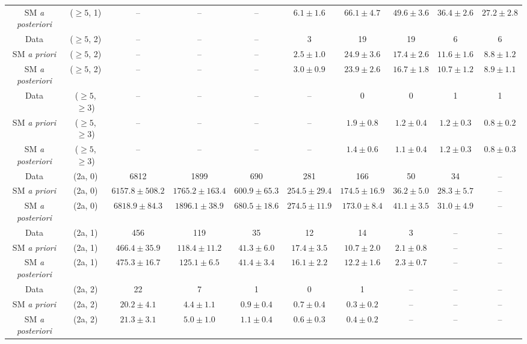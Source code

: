 \begin{table}[h!]
{\begin{tabular}{cccccccccc}
	SM \textit{a posteriori} & ($\ge5$, 1) & -- & -- & -- & $6.1\pm 1.6$ & $66.1\pm 4.7$ & $49.6\pm 3.6$ & $36.4\pm 2.6$ & $27.2\pm 2.8$ \\[0.5ex] 
	Data & ($\ge5$, 2) & -- & -- & -- & 3 & 19 & 19 & 6 & 6 \\[0.5ex] 
	SM \textit{a priori} & ($\ge5$, 2) & -- & -- & -- & $2.5\pm 1.0$ & $24.9\pm 3.6$ & $17.4\pm 2.6$ & $11.6\pm 1.6$ & $8.8\pm 1.2$ \\[0.5ex] 
	SM \textit{a posteriori} & ($\ge5$, 2) & -- & -- & -- & $3.0\pm 0.9$ & $23.9\pm 2.6$ & $16.7\pm 1.8$ & $10.7\pm 1.2$ & $8.9\pm 1.1$ \\[0.5ex] 
	Data & ($\ge5$, $\ge3$) & -- & -- & -- & -- & 0 & 0 & 1 & 1 \\[0.5ex] 
	SM \textit{a priori} & ($\ge5$, $\ge3$) & -- & -- & -- & -- & $1.9\pm 0.8$ & $1.2\pm 0.4$ & $1.2\pm 0.3$ & $0.8\pm 0.2$ \\[0.5ex] 
	SM \textit{a posteriori} & ($\ge5$, $\ge3$) & -- & -- & -- & -- & $1.4\pm 0.6$ & $1.1\pm 0.4$ & $1.2\pm 0.3$ & $0.8\pm 0.3$ \\[0.5ex] 
	Data & (2a, 0) & 6812 & 1899 & 690 & 281 & 166 & 50 & 34 & -- \\[0.5ex] 
	SM \textit{a priori} & (2a, 0) & $6157.8\pm 508.2$ & $1765.2\pm 163.4$ & $600.9\pm 65.3$ & $254.5\pm 29.4$ & $174.5\pm 16.9$ & $36.2\pm 5.0$ & $28.3\pm 5.7$ & -- \\[0.5ex] 
	SM \textit{a posteriori} & (2a, 0) & $6818.9\pm 84.3$ & $1896.1\pm 38.9$ & $680.5\pm 18.6$ & $274.5\pm 11.9$ & $173.0\pm 8.4$ & $41.1\pm 3.5$ & $31.0\pm 4.9$ & -- \\[0.5ex] 
	Data & (2a, 1) & 456 & 119 & 35 & 12 & 14 & 3 & -- & -- \\[0.5ex] 
	SM \textit{a priori} & (2a, 1) & $466.4\pm 35.9$ & $118.4\pm 11.2$ & $41.3\pm 6.0$ & $17.4\pm 3.5$ & $10.7\pm 2.0$ & $2.1\pm 0.8$ & -- & -- \\[0.5ex] 
	SM \textit{a posteriori} & (2a, 1) & $475.3\pm 16.7$ & $125.1\pm 6.5$ & $41.4\pm 3.4$ & $16.1\pm 2.2$ & $12.2\pm 1.6$ & $2.3\pm 0.7$ & -- & -- \\[0.5ex] 
	Data & (2a, 2) & 22 & 7 & 1 & 0 & 1 & -- & -- & -- \\[0.5ex] 
	SM \textit{a priori} & (2a, 2) & $20.2\pm 4.1$ & $4.4\pm 1.1$ & $0.9\pm 0.4$ & $0.7\pm 0.4$ & $0.3\pm 0.2$ & -- & -- & -- \\[0.5ex] 
	SM \textit{a posteriori} & (2a, 2) & $21.3\pm 3.1$ & $5.0\pm 1.0$ & $1.1\pm 0.4$ & $0.6\pm 0.3$ & $0.4\pm 0.2$ & -- & -- & -- \\[0.5ex] 

\end{tabular}}
\end{table}
